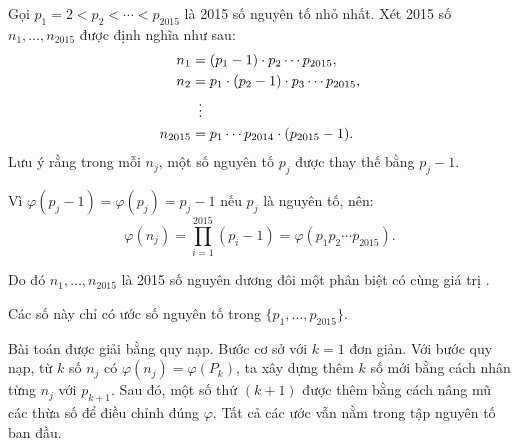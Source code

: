 \documentclass[../09-contruction-methods.tex]{subfiles}
\begin{document}
\begin{soln}
    Gọi \( p_1 = 2 < p_2 < \cdots < p_{2015} \) là 2015 số nguyên tố nhỏ nhất.  
    Xét 2015 số \( n_1, \dots, n_{2015} \) được định nghĩa như sau:
    \begin{align*}
		n_1 &= (p_1 - 1)\cdot p_2 \cdots p_{2015}, \\
		n_2 &= p_1 \cdot (p_2 - 1) \cdot p_3 \cdots p_{2015}, \\
		&\vdotswithin{=} \\
		n_{2015} &= p_1 \cdots p_{2014} \cdot (p_{2015} - 1).
    \end{align*}
    Lưu ý rằng trong mỗi \( n_j \), một số nguyên tố \( p_j \) được thay thế bằng \( p_j - 1 \).  

    Vì \( \varphi(p_j - 1) = \varphi(p_j) = p_j - 1 \) nếu \( p_j \) là nguyên tố, nên:
    \[
    	\varphi(n_j) = \prod_{i=1}^{2015} (p_i - 1) = \varphi(p_1 p_2 \cdots p_{2015}).
    \]

    Do đó \( n_1, \dots, n_{2015} \) là 2015 số nguyên dương đôi một phân biệt có cùng giá trị .

    Các số này chỉ có ước số nguyên tố trong \( \{p_1, \dots, p_{2015}\} \).
\end{soln}


\newpage

\begin{story*}
    Bài toán được giải bằng quy nạp. Bước cơ sở với \( k = 1 \) đơn giản. Với bước quy nạp, từ \( k \) số \( n_j \) có \( \varphi(n_j) = \varphi(P_k) \), ta xây dựng thêm \( k \) số mới bằng cách nhân từng \( n_j \) với \( p_{k+1} \). Sau đó, một số thứ \( (k+1) \) được thêm bằng cách nâng mũ các thừa số để điều chỉnh đúng \( \varphi \). Tất cả các ước vẫn nằm trong tập nguyên tố ban đầu.
\end{story*}
\end{document}
